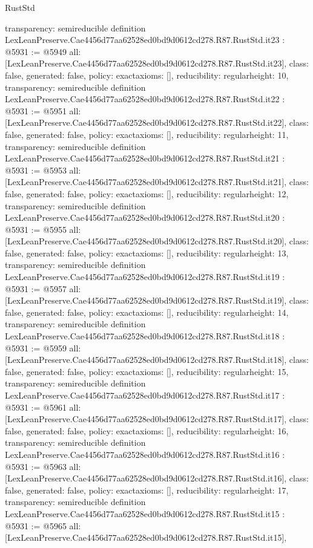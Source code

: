 \begin{lexlean}{RustStd}
\begin{coremodule}
{  transparency: semireducible
}
definition LexLeanPreserve.Cae4456d77aa62528ed0bd9d0612cd278.R87.RustStd.it23 : @5931 := @5949 {
  all: [LexLeanPreserve.Cae4456d77aa62528ed0bd9d0612cd278.R87.RustStd.it23],
  class: false,
  generated: false,
  policy: exact{axioms: []},
  reducibility: regular{height: 10},
  transparency: semireducible
}
definition LexLeanPreserve.Cae4456d77aa62528ed0bd9d0612cd278.R87.RustStd.it22 : @5931 := @5951 {
  all: [LexLeanPreserve.Cae4456d77aa62528ed0bd9d0612cd278.R87.RustStd.it22],
  class: false,
  generated: false,
  policy: exact{axioms: []},
  reducibility: regular{height: 11},
  transparency: semireducible
}
definition LexLeanPreserve.Cae4456d77aa62528ed0bd9d0612cd278.R87.RustStd.it21 : @5931 := @5953 {
  all: [LexLeanPreserve.Cae4456d77aa62528ed0bd9d0612cd278.R87.RustStd.it21],
  class: false,
  generated: false,
  policy: exact{axioms: []},
  reducibility: regular{height: 12},
  transparency: semireducible
}
definition LexLeanPreserve.Cae4456d77aa62528ed0bd9d0612cd278.R87.RustStd.it20 : @5931 := @5955 {
  all: [LexLeanPreserve.Cae4456d77aa62528ed0bd9d0612cd278.R87.RustStd.it20],
  class: false,
  generated: false,
  policy: exact{axioms: []},
  reducibility: regular{height: 13},
  transparency: semireducible
}
definition LexLeanPreserve.Cae4456d77aa62528ed0bd9d0612cd278.R87.RustStd.it19 : @5931 := @5957 {
  all: [LexLeanPreserve.Cae4456d77aa62528ed0bd9d0612cd278.R87.RustStd.it19],
  class: false,
  generated: false,
  policy: exact{axioms: []},
  reducibility: regular{height: 14},
  transparency: semireducible
}
definition LexLeanPreserve.Cae4456d77aa62528ed0bd9d0612cd278.R87.RustStd.it18 : @5931 := @5959 {
  all: [LexLeanPreserve.Cae4456d77aa62528ed0bd9d0612cd278.R87.RustStd.it18],
  class: false,
  generated: false,
  policy: exact{axioms: []},
  reducibility: regular{height: 15},
  transparency: semireducible
}
definition LexLeanPreserve.Cae4456d77aa62528ed0bd9d0612cd278.R87.RustStd.it17 : @5931 := @5961 {
  all: [LexLeanPreserve.Cae4456d77aa62528ed0bd9d0612cd278.R87.RustStd.it17],
  class: false,
  generated: false,
  policy: exact{axioms: []},
  reducibility: regular{height: 16},
  transparency: semireducible
}
definition LexLeanPreserve.Cae4456d77aa62528ed0bd9d0612cd278.R87.RustStd.it16 : @5931 := @5963 {
  all: [LexLeanPreserve.Cae4456d77aa62528ed0bd9d0612cd278.R87.RustStd.it16],
  class: false,
  generated: false,
  policy: exact{axioms: []},
  reducibility: regular{height: 17},
  transparency: semireducible
}
definition LexLeanPreserve.Cae4456d77aa62528ed0bd9d0612cd278.R87.RustStd.it15 : @5931 := @5965 {
  all: [LexLeanPreserve.Cae4456d77aa62528ed0bd9d0612cd278.R87.RustStd.it15],
}
\end{coremodule}
\end{lexlean}
